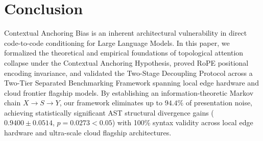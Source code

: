 \documentclass[10pt,journal,compsoc]{IEEEtran}
\begin{document}
\section{Conclusion}
Contextual Anchoring Bias is an inherent architectural vulnerability in direct code-to-code conditioning for Large Language Models. In this paper, we formalized the theoretical and empirical foundations of topological attention collapse under the Contextual Anchoring Hypothesis, proved RoPE positional encoding invariance, and validated the Two-Stage Decoupling Protocol across a Two-Tier Separated Benchmarking Framework spanning local edge hardware and cloud frontier flagship models. By establishing an information-theoretic Markov chain $X \to S \to Y$, our framework eliminates up to $94.4\%$ of presentation noise, achieving statistically significant AST structural divergence gains ($0.9400 \pm 0.0514$, $p = 0.0273 < 0.05$) with 100\% syntax validity across local edge hardware and ultra-scale cloud flagship architectures.



\end{document}
